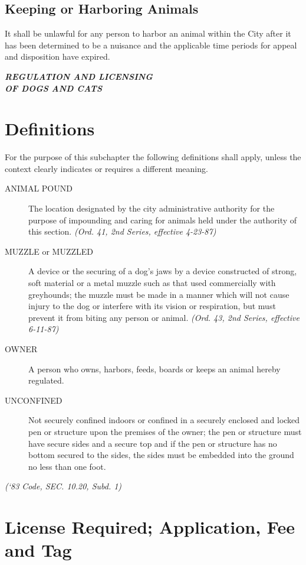 \subsection{Keeping or Harboring Animals}
It shall be unlawful for any person to harbor an animal within the City after it has been determined to be a nuisance and the applicable time periods for appeal and disposition have expired.\\

\begin{center}
\emph{\textbf{\LARGE{REGULATION AND LICENSING\\[.1cm] OF DOGS AND CATS}}}
\end{center}

\setcounter{section}{14}
\section{Definitions}
For the purpose of this subchapter the following definitions shall apply, unless the context clearly indicates or requires a different meaning.
\begin{description}
    \item[ANIMAL POUND] The location designated by the city administrative authority for the purpose of impounding and caring for animals held under the authority of this section. \emph{(Ord. 41, 2nd Series, effective 4-23-87)}
    \item[MUZZLE or MUZZLED] A device or the securing of a dog’s jaws by a device constructed of strong, soft material or a metal muzzle such as that used commercially with greyhounds; the muzzle must be made in a manner which will not cause injury to the dog or interfere with its vision or respiration, but must prevent it from biting any person or animal. \emph{(Ord. 43, 2nd Series, effective 6-11-87)}
    \item[OWNER] A person who owns, harbors, feeds, boards or keeps an animal hereby regulated.
    \item[UNCONFINED] Not securely confined indoors or confined in a securely enclosed and locked pen or structure upon the premises of the owner; the pen or structure must have secure sides and a secure top and if the pen or structure has no bottom secured to the sides, the sides must be embedded into the ground no less than one foot.
\end{description}
\emph{(‘83 Code, SEC. 10.20, Subd. 1)}
\section{License Required; Application, Fee and Tag}
